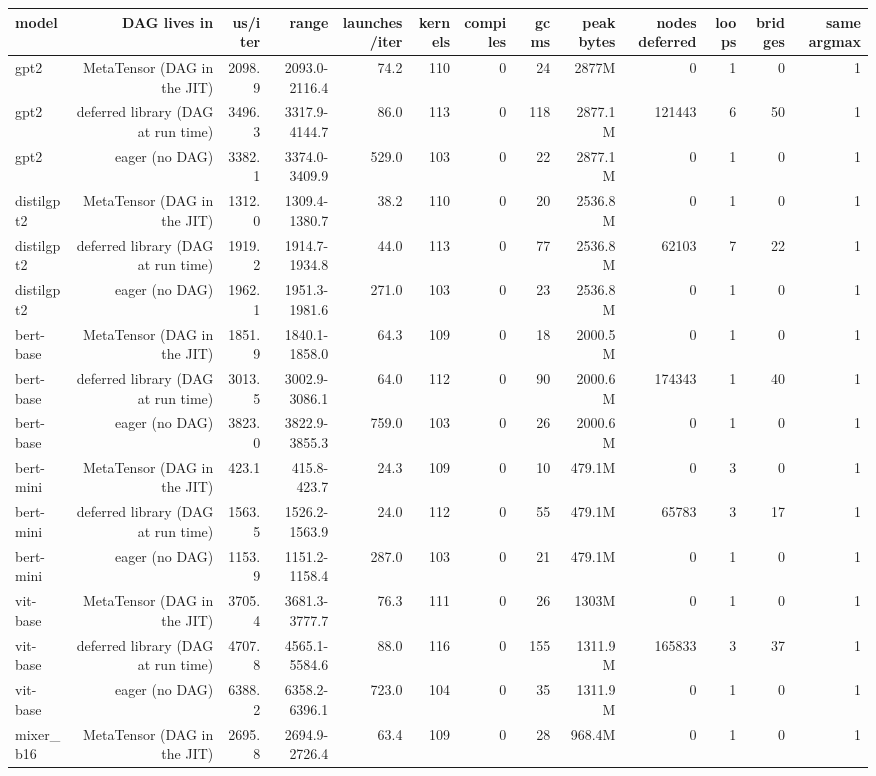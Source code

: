 \begin{tabular}{lrrrrrrrrrrrr}
\toprule
model & DAG lives in & us/iter & range & launches/iter & kernels & compiles & gc ms & peak bytes & nodes deferred & loops & bridges & same argmax \\
\midrule
gpt2 & MetaTensor (DAG in the JIT) & 2098.9 & 2093.0-2116.4 & 74.2 & 110 & 0 & 24 & 2877M & 0 & 1 & 0 & 1 \\
gpt2 & deferred library (DAG at run time) & 3496.3 & 3317.9-4144.7 & 86.0 & 113 & 0 & 118 & 2877.1M & 121443 & 6 & 50 & 1 \\
gpt2 & eager (no DAG) & 3382.1 & 3374.0-3409.9 & 529.0 & 103 & 0 & 22 & 2877.1M & 0 & 1 & 0 & 1 \\
distilgpt2 & MetaTensor (DAG in the JIT) & 1312.0 & 1309.4-1380.7 & 38.2 & 110 & 0 & 20 & 2536.8M & 0 & 1 & 0 & 1 \\
distilgpt2 & deferred library (DAG at run time) & 1919.2 & 1914.7-1934.8 & 44.0 & 113 & 0 & 77 & 2536.8M & 62103 & 7 & 22 & 1 \\
distilgpt2 & eager (no DAG) & 1962.1 & 1951.3-1981.6 & 271.0 & 103 & 0 & 23 & 2536.8M & 0 & 1 & 0 & 1 \\
bert-base & MetaTensor (DAG in the JIT) & 1851.9 & 1840.1-1858.0 & 64.3 & 109 & 0 & 18 & 2000.5M & 0 & 1 & 0 & 1 \\
bert-base & deferred library (DAG at run time) & 3013.5 & 3002.9-3086.1 & 64.0 & 112 & 0 & 90 & 2000.6M & 174343 & 1 & 40 & 1 \\
bert-base & eager (no DAG) & 3823.0 & 3822.9-3855.3 & 759.0 & 103 & 0 & 26 & 2000.6M & 0 & 1 & 0 & 1 \\
bert-mini & MetaTensor (DAG in the JIT) & 423.1 & 415.8-423.7 & 24.3 & 109 & 0 & 10 & 479.1M & 0 & 3 & 0 & 1 \\
bert-mini & deferred library (DAG at run time) & 1563.5 & 1526.2-1563.9 & 24.0 & 112 & 0 & 55 & 479.1M & 65783 & 3 & 17 & 1 \\
bert-mini & eager (no DAG) & 1153.9 & 1151.2-1158.4 & 287.0 & 103 & 0 & 21 & 479.1M & 0 & 1 & 0 & 1 \\
vit-base & MetaTensor (DAG in the JIT) & 3705.4 & 3681.3-3777.7 & 76.3 & 111 & 0 & 26 & 1303M & 0 & 1 & 0 & 1 \\
vit-base & deferred library (DAG at run time) & 4707.8 & 4565.1-5584.6 & 88.0 & 116 & 0 & 155 & 1311.9M & 165833 & 3 & 37 & 1 \\
vit-base & eager (no DAG) & 6388.2 & 6358.2-6396.1 & 723.0 & 104 & 0 & 35 & 1311.9M & 0 & 1 & 0 & 1 \\
mixer\_b16 & MetaTensor (DAG in the JIT) & 2695.8 & 2694.9-2726.4 & 63.4 & 109 & 0 & 28 & 968.4M & 0 & 1 & 0 & 1 \\

\end{tabular}
